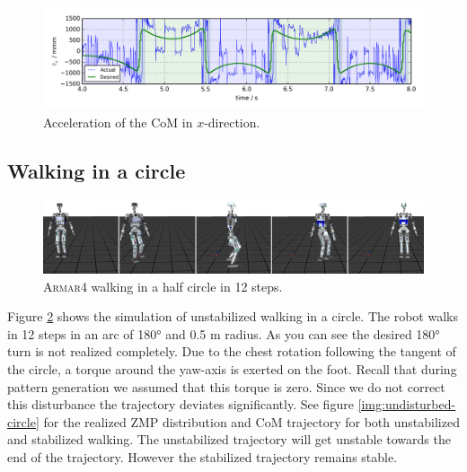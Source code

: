 \documentclass[english,ngerman]{KITreprt}
\newcommand{\name}[1]{\textsc{#1}}
\begin{document}
\begin{figure}[hbt]
\vspace*{-1em}
\includegraphics[width=\textwidth,resolution=300]{images/noisy_com_acc.png}
\caption{Acceleration of the CoM in $x$-direction.}
\label{img:noisy-com-acc}
\end{figure}

\subsection{Walking in a circle}\label{walking-in-a-circle}

\begin{figure}[hbt]
\vspace*{-1em}
\includegraphics[width=\textwidth,resolution=300]{images/undisturbed_circle_thumbs.png}
\caption{\name{Armar4} walking in a half circle in 12 steps.}
\label{img:player-undisturbed-circle-thumbs}
\end{figure}

Figure \ref{img:player-undisturbed-circle-thumbs} shows the simulation
of unstabilized walking in a circle. The robot walks in 12 steps in an
arc of 180° and 0.5 m radius. As you can see the desired 180° turn is
not realized completely. Due to the chest rotation following the tangent
of the circle, a torque around the yaw-axis is exerted on the foot.
Recall that during pattern generation we assumed that this torque is
zero. Since we do not correct this disturbance the trajectory deviates
significantly. See figure \ref{img:undisturbed-circle} for the realized
ZMP distribution and CoM trajectory for both unstabilized and stabilized
walking. The unstabilized trajectory will get unstable towards the end
of the trajectory. However the stabilized trajectory remains stable.
\end{document}
